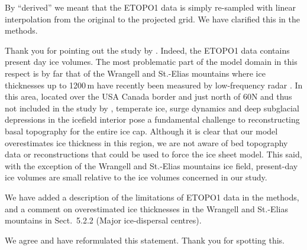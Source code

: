 By ``derived'' we meant that the ETOPO1 data is simply re-sampled with linear
interpolation from the original to the projected grid. We have clarified this in
the methods.

Thank you for pointing out the study by \citet{Clarke.etal.2013}.
Indeed, the ETOPO1 data contains present day ice volumes. The most problematic
part of the model domain in this respect is by far that of the Wrangell and
St.-Elias mountains where ice thicknesses up to 1200\,m have recently been
measured by low-frequency radar \citep{Rignot.etal.2013}. In this area, located
over the USA Canada border and just north of 60{\degree}N and thus not included
in the study by \citet{Clarke.etal.2013}, temperate ice, surge dynamics
and deep subglacial depressions in the icefield interior pose a fundamental
challenge to reconstructing basal topography for the entire ice cap. Although
it is clear that our model overestimates ice thickness in this region, we are
not aware of bed topography data or reconstructions that could be used to force
the ice sheet model. This said, with the exception of the Wrangell and
St.-Elias mountains ice field, present-day ice volumes are small relative to
the ice volumes concerned in our study.

We have added a description of the limitations of ETOPO1 data in the methods,
and a comment on overestimated ice thicknesses in the Wrangell and St.-Elias
mountains in Sect.~5.2.2 (Major ice-dispersal centres).


We agree and have reformulated this statement. Thank you for spotting this.


